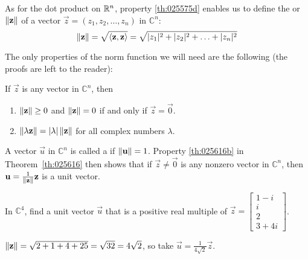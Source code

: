 \documentclass{ximera}
\begin{document}
\begin{definition}\label{def:025606}
As for the dot product on $\mathbb{R}^n$, property \ref{th:025575d} enables us to define the  or  $\left\lVert\mathbf{z}\right\rVert$ of a vector $\vec{z} = (z_{1}, z_{2}, \ldots, z_{n})$ in $\mathbb{C}^n$:
\begin{equation*}
\left\lVert\mathbf{z}\right\rVert = \sqrt{\langle \mathbf{z}, \mathbf{z} \rangle} = \sqrt{|z_{1}|^2 + |z_{2}|^2 + \ldots + |z_{n}|^2}
\end{equation*}
\end{definition}

The only properties of the norm function we will need are the following (the proofs are left to the reader):


\begin{theorem}\label{th:025616}
If $\vec{z}$ is any vector in $\mathbb{C}^n$, then


\begin{enumerate}
\item\label{th:025616a} $\left\lVert\mathbf{z}\right\rVert \ge 0$ and $\left\lVert\mathbf{z}\right\rVert = 0$ if and only if $\vec{z} = \vec{0}$.

\item\label{th:025616b} $\left\lVert\lambda\mathbf{z}\right\rVert = |\lambda| \left\lVert\mathbf{z}\right\rVert$ for all complex numbers $\lambda$.

\end{enumerate}
\end{theorem}

A vector $\vec{u}$ in $\mathbb{C}^n$ is called a  if $\left\lVert\mathbf{u}\right\rVert = 1$. Property \ref{th:025616b} in Theorem~\ref{th:025616} then shows that if $\vec{z} \neq \vec{0}$ is any nonzero vector in $\mathbb{C}^n$, then $\mathbf{u} = \frac{1}{\left\lVert\mathbf{z}\right\rVert}\mathbf{z}$ is a unit vector.


\begin{example}\label{ex:025631}
In $\mathbb{C}^4$, find a unit vector $\vec{u}$ that is a positive real multiple of $\vec{z} = \begin{bmatrix} 1 - i\\ i\\ 2\\ 3 + 4i \end{bmatrix}$.


\begin{explanation}
$\left\lVert\mathbf{z}\right\rVert = \sqrt{2+1+4+25} = \sqrt{32} = 4\sqrt{2}$, so take $\vec{u} = \frac{1}{4\sqrt{2}}\vec{z}$.
\end{explanation}
\end{example}
\end{document}
